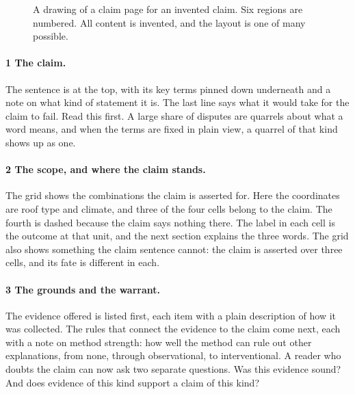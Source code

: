 \documentclass[11pt]{article}
\newcommand{\mk}[1]{\textcircled{\scriptsize\bfseries #1}}
\begin{document}
\begin{figure}[!p]
\caption{A drawing of a claim page for an invented claim. Six regions are numbered. All content is invented, and the layout is one of many possible.}\label{fig:page}
\end{figure}

\paragraph{\mk{1} The claim.} The sentence is at the top, with its key terms pinned down underneath and a note on what kind of statement it is. The last line says what it would take for the claim to fail. Read this first. A large share of disputes are quarrels about what a word means, and when the terms are fixed in plain view, a quarrel of that kind shows up as one.

\paragraph{\mk{2} The scope, and where the claim stands.} The grid shows the combinations the claim is asserted for. Here the coordinates are roof type and climate, and three of the four cells belong to the claim. The fourth is dashed because the claim says nothing there. The label in each cell is the outcome at that unit, and the next section explains the three words. The grid also shows something the claim sentence cannot: the claim is asserted over three cells, and its fate is different in each.

\paragraph{\mk{3} The grounds and the warrant.} The evidence offered is listed first, each item with a plain description of how it was collected. The rules that connect the evidence to the claim come next, each with a note on method strength: how well the method can rule out other explanations, from none, through observational, to interventional. A reader who doubts the claim can now ask two separate questions. Was this evidence sound? And does evidence of this kind support a claim of this kind?
\end{document}
